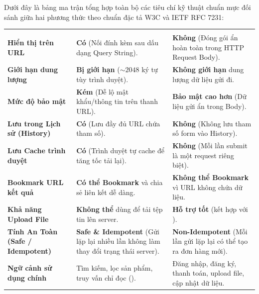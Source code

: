 Dưới đây là bảng ma trận tổng hợp toàn bộ các tiêu chí kỹ thuật chuẩn mực đối sánh giữa hai phương thức theo chuẩn đặc tả W3C và IETF RFC 7231:

\begin{prettyTableBox}
\begin{tabularx}{\linewidth}{>{\sffamily\bfseries\color{primaryBlue}}K{3.4cm} Z Z}
 &  &  \\

Hiển thị trên URL & \textbf{Có} (Nối đính kèm sau dấu  dạng Query String). & \textbf{Không} (Đóng gói ẩn hoàn toàn trong HTTP Request Body). \\

Giới hạn dung lượng & \textbf{Bị giới hạn} ($\sim 2048$ ký tự tùy trình duyệt). & \textbf{Không giới hạn} dung lượng dữ liệu gửi đi. \\

Mức độ bảo mật & \textbf{Kém} (Dễ lộ mật khẩu/thông tin trên thanh URL). & \textbf{Bảo mật cao hơn} (Dữ liệu gửi ẩn trong Body). \\

Lưu trong Lịch sử (History) & \textbf{Có} (Lưu đầy đủ URL chứa tham số). & \textbf{Không} (Không lưu tham số form vào History). \\

Lưu Cache trình duyệt & \textbf{Có} (Trình duyệt tự cache để tăng tốc tải lại). & \textbf{Không} (Mỗi lần submit là một request riêng biệt). \\

Bookmark URL kết quả & \textbf{Có thể Bookmark} và chia sẻ liên kết dễ dàng. & \textbf{Không thể Bookmark} vì URL không chứa dữ liệu. \\

Khả năng Upload File & \textbf{Không thể} dùng để tải tệp tin lên server. & \textbf{Hỗ trợ tốt} (kết hợp với ). \\

Tính An Toàn (Safe / Idempotent) & \textbf{Safe \& Idempotent} (Gửi lặp lại nhiều lần không làm thay đổi trạng thái server). & \textbf{Non-Idempotent} (Mỗi lần gửi lặp lại có thể tạo ra đơn hàng mới). \\

Ngữ cảnh sử dụng chính & Tìm kiếm, lọc sản phẩm, truy vấn chỉ đọc (). & Đăng nhập, đăng ký, thanh toán, upload file, cập nhật dữ liệu. \\
\end{tabularx}
\end{prettyTableBox}

